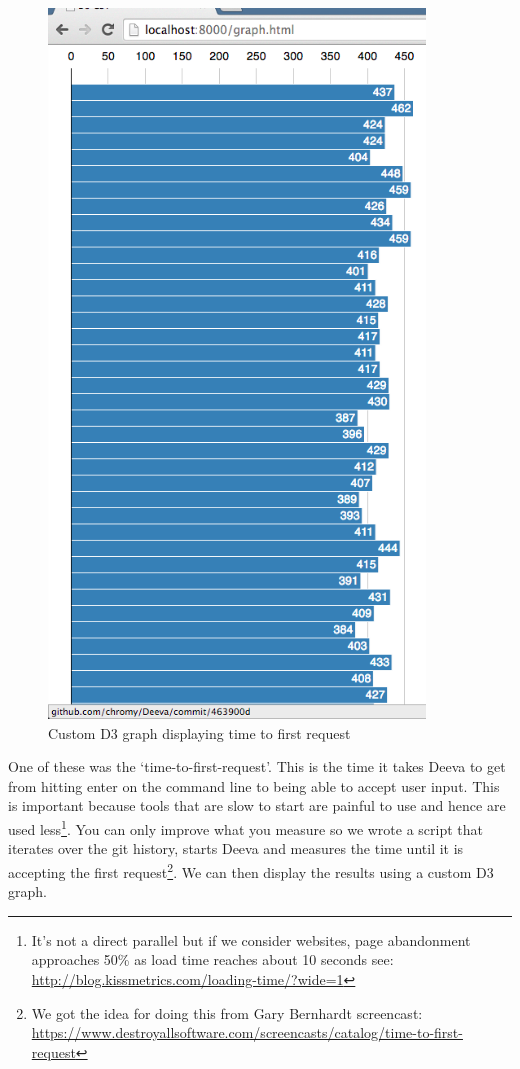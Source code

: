 \documentclass[11pt, a4paper]{article}
\begin{document}
\begin{figure}[h!]
\centering
\includegraphics[width=100mm]{timeToFirstRequest.png}
\caption{Custom D3 graph displaying  time to first request}
\label{fig:timeToFirstRequest}
\end{figure}

One of these was the `time-to-first-request'.
This is the time it takes Deeva to get from hitting enter on the command line to being able to accept user input.
This is important because tools that are slow to start are painful to use and hence are used less\footnote{It's not a direct parallel but if we consider websites, page abandonment approaches 50\% as load time reaches about 10 seconds see: \url{http://blog.kissmetrics.com/loading-time/?wide=1}}.
You can only improve what you measure so we wrote a script that iterates over the git history, starts Deeva and measures the time until it is accepting the first request\footnote{We got the idea for doing this from Gary Bernhardt screencast: \url{https://www.destroyallsoftware.com/screencasts/catalog/time-to-first-request}}.
We can then display the results using a custom D3 graph.
\end{document}
